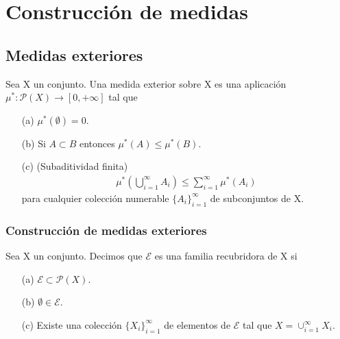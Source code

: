 \chapter{Construcción de medidas}

\section{Medidas exteriores}

\begin{defi}
    Sea X un conjunto. Una medida exterior sobre X es una aplicación $\mu^*: \mathcal{P}(X) \longrightarrow [0,+\infty]$ tal que
    \begin{enumerate}
        \item[(a)] $\mu^*(\emptyset) = 0$.
        \item[(b)] Si $A \subset B$ entonces $\mu^*(A) \leq \mu^*(B)$.
        \item[(c)] (Subaditividad finita)
              \begin{align*}
                  \mu^*\left(\bigcup_{i=1}^{\infty}{A_i} \right) \leq \sum_{i=1}^{\infty}{\mu^*(A_i)}
              \end{align*}
              para cualquier colección numerable $\{A_i\}_{i=1}^{\infty}$ de subconjuntos de X.
    \end{enumerate}
\end{defi}

\subsection{Construcción de medidas exteriores}

\begin{defi}
    Sea X un conjunto. Decimos que $\mathcal{E}$ es una familia recubridora de X si
    \begin{enumerate}
        \item[(a)] $\mathcal{E} \subset \mathcal{P}(X)$.
        \item[(b)] $\emptyset \in \mathcal{E}$.
        \item[(c)] Existe una colección $\{X_i\}_{i=1}^{\infty}$ de elementos de $\mathcal{E}$ tal que
              $X = \cup_{i=1}^{\infty}{X_i}$.
    \end{enumerate}
\end{defi}

